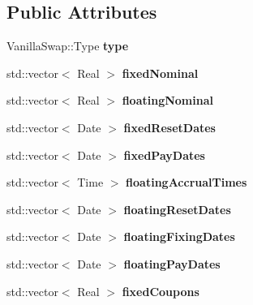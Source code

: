 \subsection*{Public Attributes}
\begin{DoxyCompactItemize}
\item 
Vanilla\+Swap\+::\+Type {\bfseries type}\label{class_quant_lib_1_1_nonstandard_swap_1_1arguments_aac20d61a4b26bae79523ad0698fce3aa}

\item 
std\+::vector$<$ Real $>$ {\bfseries fixed\+Nominal}\label{class_quant_lib_1_1_nonstandard_swap_1_1arguments_a3b5f93cbdc8ea3b538683bfac9bc1389}

\item 
std\+::vector$<$ Real $>$ {\bfseries floating\+Nominal}\label{class_quant_lib_1_1_nonstandard_swap_1_1arguments_a997ed6c3d81e1965019a4c44a7f9b10f}

\item 
std\+::vector$<$ Date $>$ {\bfseries fixed\+Reset\+Dates}\label{class_quant_lib_1_1_nonstandard_swap_1_1arguments_a342260bea53a943a14112a3ed2669e23}

\item 
std\+::vector$<$ Date $>$ {\bfseries fixed\+Pay\+Dates}\label{class_quant_lib_1_1_nonstandard_swap_1_1arguments_a1036a4654f1bc44552e55b8475ff88bf}

\item 
std\+::vector$<$ Time $>$ {\bfseries floating\+Accrual\+Times}\label{class_quant_lib_1_1_nonstandard_swap_1_1arguments_a37c151aec609087ec1bf93efe2816820}

\item 
std\+::vector$<$ Date $>$ {\bfseries floating\+Reset\+Dates}\label{class_quant_lib_1_1_nonstandard_swap_1_1arguments_a45329d74d731a38606dd88a00c60ce5d}

\item 
std\+::vector$<$ Date $>$ {\bfseries floating\+Fixing\+Dates}\label{class_quant_lib_1_1_nonstandard_swap_1_1arguments_aade32fbbc9ef11a709a2d6178e6bc062}

\item 
std\+::vector$<$ Date $>$ {\bfseries floating\+Pay\+Dates}\label{class_quant_lib_1_1_nonstandard_swap_1_1arguments_a554ff08f298f5c9f281f23fd4ffd05fc}

\item 
std\+::vector$<$ Real $>$ {\bfseries fixed\+Coupons}\label{class_quant_lib_1_1_nonstandard_swap_1_1arguments_a805e4226abb7e53214d6dd4b78fc6838}


\end{DoxyCompactItemize}
